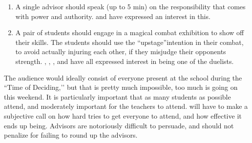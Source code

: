 \documentclass[green]{GL2020}
\begin{document}
\begin{enumerate}
\begin{enumerate}
    \item A single advisor should speak (up to 5 min) on the responsibility that comes with power and authority. \cHedonist{\full} and \cCurse{\full} have expressed an interest in this.
    \item A pair of students should engage in a magical combat exhibition to show off their skills. The students should use the “upstage”intention in their combat, to avoid actually injuring each other, if they misjudge their opponents strength. \cTechStar{\full}, \cHeir{\full}, \cLibAssist{\full}, and \cAmbition{\full} have all expressed interest in being one of the duelists.
  \end{enumerate}
\end{enumerate}

The audience would ideally consist of everyone present at the school during the ``Time of Deciding,’’ but that is pretty much impossible, too much is going on this weekend. It is particularly important that as many students as possible attend, and moderately important for the teachers to attend. \cPrincipal{} will have to make a subjective call on how hard \cMusic{} tries to get everyone to attend, and how effective it ends up being. Advisors are notoriously difficult to persuade, and \cPrincipal{} should not penalize \cMusic{} for failing to round up the advisors.
\end{document}
